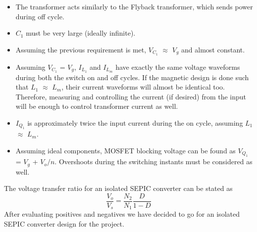 \begin{itemize}
    \item The transformer acts similarly to the Flyback transformer, which sends power during off cycle.
    \item $C_1$ must be very large (ideally infinite).
    \item Assuming the previous requirement is met, $V_{C_1}$ $\approx$ $V_g$ and almost constant.
    \item Assuming $V_{C_1}$ = $V_g$, $I_{L_1}$ and $I_{L_m}$ have exactly the same voltage waveforms  during both the switch on and off cycles. If the magnetic design is done such that $L_1$ $\approx$ $L_m$, their current waveforms will almost be identical too. Therefore, measuring and controlling the current (if desired) from the input will be enough to control transformer current as well.
    \item $I_{Q_1}$ is approximately twice the input current during the on cycle, assuming $L_1$ $\approx$ $L_m$.
    \item Assuming ideal components, MOSFET blocking voltage can be found as $V_{Q_1}$ = $V_g$ + $V_o/n$. Overshoots during the switching instants must be considered as well.
\end{itemize}
The voltage transfer ratio for an isolated SEPIC converter can be stated as
\begin{equation*}
    \frac{V_o}{V_s} = \frac{N_2}{N_1}\frac{D}{1-D}
\end{equation*}
After evaluating positives and negatives we have decided to go for an isolated SEPIC converter design for the project.